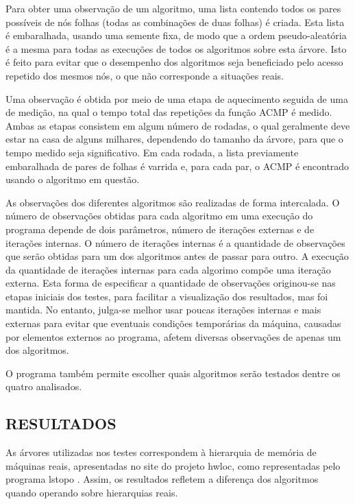 Para obter uma observação de um algoritmo, uma lista contendo todos os pares possíveis de nós folhas (todas as combinações de duas folhas) é criada.
Esta lista é embaralhada, usando uma semente fixa, de modo que a ordem pseudo-aleatória é a mesma para todas as execuções de todos os algoritmos sobre esta árvore.
Isto é feito para evitar que o desempenho dos algoritmos seja beneficiado pelo acesso repetido dos mesmos nós, o que não corresponde a situações reais.

Uma observação é obtida por meio de uma etapa de aquecimento seguida de uma de medição, na qual o tempo total das repetições da função ACMP é medido.
Ambas as etapas consistem em algum número de rodadas, o qual geralmente deve estar na casa de alguns milhares, dependendo do tamanho da árvore, para que o tempo medido seja significativo.
Em cada rodada, a lista previamente embaralhada de pares de folhas é varrida e, para cada par, o ACMP é encontrado usando o algoritmo em questão.

As observações dos diferentes algoritmos são realizadas de forma intercalada.
O número de observações obtidas para cada algoritmo em uma execução do programa depende de dois parâmetros, número de iterações externas e de iterações internas.
O número de iterações internas é a quantidade de observações que serão obtidas para um dos algoritmos antes de passar para outro.
A execução da quantidade de iterações internas para cada algorimo compõe uma iteração externa.
Esta forma de especificar a quantidade de observações originou-se nas etapas iniciais dos testes, para facilitar a visualização dos resultados, mas foi mantida.
No entanto, julga-se melhor usar poucas iterações internas e mais externas para evitar que eventuais condições temporárias da máquina, causadas por elementos externos ao programa, afetem diversas observações de apenas um dos algoritmos.

O programa também permite escolher quais algoritmos serão testados dentre os quatro analisados.



\subsection{RESULTADOS}

As árvores utilizadas nos testes correspondem à hierarquia de memória de máquinas reais, apresentadas no site do projeto hwloc, como representadas pelo programa lstopo \cite{lstopo}.
Assim, os resultados refletem a diferença dos algoritmos quando operando sobre hierarquias reais.

